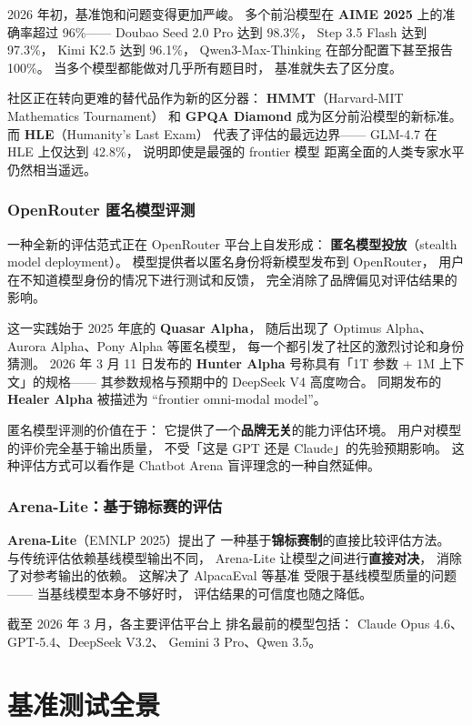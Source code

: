 2026 年初，基准饱和问题变得更加严峻。
多个前沿模型在 \textbf{AIME 2025} 上的准确率超过 96\%——
Doubao Seed 2.0 Pro 达到 98.3\%，
Step 3.5 Flash 达到 97.3\%，
Kimi K2.5 达到 96.1\%，
Qwen3-Max-Thinking 在部分配置下甚至报告 100\%。
当多个模型都能做对几乎所有题目时，
基准就失去了区分度。

社区正在转向更难的替代品作为新的区分器：
\textbf{HMMT}（Harvard-MIT Mathematics Tournament）
和 \textbf{GPQA Diamond} 成为区分前沿模型的新标准。
而 \textbf{HLE}（Humanity's Last Exam）
代表了评估的最远边界——
GLM-4.7 在 HLE 上仅达到 42.8\%，
说明即使是最强的 frontier 模型
距离全面的人类专家水平仍然相当遥远。

\subsubsection{OpenRouter 匿名模型评测}

一种全新的评估范式正在 OpenRouter 平台上自发形成：
\textbf{匿名模型投放}（stealth model deployment）。
模型提供者以匿名身份将新模型发布到 OpenRouter，
用户在不知道模型身份的情况下进行测试和反馈，
完全消除了品牌偏见对评估结果的影响。

这一实践始于 2025 年底的 \textbf{Quasar Alpha}，
随后出现了 Optimus Alpha、Aurora Alpha、Pony Alpha 等匿名模型，
每一个都引发了社区的激烈讨论和身份猜测。
2026 年 3 月 11 日发布的 \textbf{Hunter Alpha}
号称具有「1T 参数 + 1M 上下文」的规格——
其参数规格与预期中的 DeepSeek V4 高度吻合。
同期发布的 \textbf{Healer Alpha} 被描述为
``frontier omni-modal model''。

匿名模型评测的价值在于：
它提供了一个\textbf{品牌无关}的能力评估环境。
用户对模型的评价完全基于输出质量，
不受「这是 GPT 还是 Claude」的先验预期影响。
这种评估方式可以看作是
Chatbot Arena 盲评理念的一种自然延伸。

\subsubsection{Arena-Lite：基于锦标赛的评估}

\textbf{Arena-Lite}（EMNLP 2025）提出了
一种基于\textbf{锦标赛制}的直接比较评估方法。
与传统评估依赖基线模型输出不同，
Arena-Lite 让模型之间进行\textbf{直接对决}，
消除了对参考输出的依赖。
这解决了 AlpacaEval 等基准
受限于基线模型质量的问题——
当基线模型本身不够好时，
评估结果的可信度也随之降低。

截至 2026 年 3 月，各主要评估平台上
排名最前的模型包括：
Claude Opus 4.6、GPT-5.4、DeepSeek V3.2、
Gemini 3 Pro、Qwen 3.5。

\section{基准测试全景}

